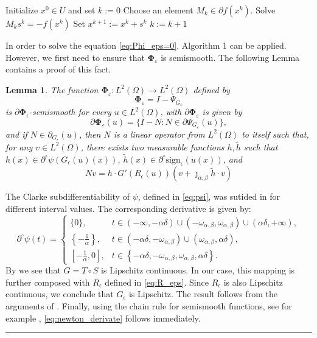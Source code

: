 \documentclass[11pt,a4paper]{amsart}
\newcommand{\kw}{\rule{2mm}{2mm}}
\renewcommand{\l}{\left}
\renewcommand{\r}{\right}
\newcommand{\om}{\Omega}
\newcommand{\sign}{\mathrm{sign}}
\renewenvironment{proof}{{Proof.}}{\hfill\kw}
\newtheorem{lemma}{{Lemma}}
\begin{document}
\begin{algorithm}
\caption{Semismooth Newton Algorithm}\label{alg:SSN}
\begin{algorithmic}[1]
\State Initialize $x^0 \in U$ and set $k := 0$
    \State Choose an element $M_k\in \partial f(x^k)$.
    \State Solve $M_ks^k = -f(x^k)$ 
    \State Set $x^{k+1} := x^k + s^k$
    \State $k := k + 1$
\EndWhile
\end{algorithmic}
\end{algorithm}
 In order to solve the equation \eqref{eq:Phi_eps=0}, Algorithm 1 can be applied. However, we first need to ensure that $\mathbf{\Phi}_\varepsilon$ is semismooth. The following Lemma contains a proof of this fact.

\begin{lemma}\label{lemma2} 
The function $\mathbf{\Phi}_\varepsilon: L^2(\om) \to L^2(\om)$ defined by
$$ \mathbf{\Phi}_\varepsilon = I - \Psi_{G_\varepsilon}$$
is $\partial \mathbf{\Phi}_{\epsilon}$-semismooth for every $u\in L^2(\om)$, with $\partial \mathbf{\Phi}_\varepsilon$ is given by
\begin{equation}
\partial \mathbf{\Phi}_\varepsilon (u) =\{I-N: N\in \partial \Psi_{G_\varepsilon}(u) \},
\end{equation}
and if $N\in \partial_{G_{\epsilon}}(u)$, then $N$ is a linear operator from $L^2(\om)$ to itself such that, for any $v\in L^2(\om)$, there exists two measurable functions $h, \tilde{h}$ such that $h(x)\in \partial^{\circ}\psi(G_{\epsilon}(u)(x))$, $\tilde{h}(x)\in \partial^{\circ}\sign_{\epsilon}(u(x))$, and
\begin{equation}\label{eq:newton_derivate}
Nv=h\cdot G'(R_{\epsilon}(u))(v+\jmath_{\alpha,\beta}\tilde{h}\cdot v)
\end{equation}

\end{lemma}
\begin{proof}
The Clarke subdifferentiability of $\psi$, defined in \eqref{eq:psi}, was sutided in \cite{CasasMateos2024} for different interval values. The corresponding derivative is given by:
    \[
    \partial^{\circ}\psi(t)=\begin{cases}
        \{0\}, & t\in (-\infty, -\alpha\delta)\cup (-\omega_{\alpha,\beta}, \omega_{\alpha,\beta})\cup (\alpha\delta,+\infty),\\
        \l\{-\frac{1}{\alpha}\r\}, & t \in (-\alpha \delta,-\omega_{\alpha,\beta})\cup (\omega_{\alpha,\beta}, \alpha \delta),\\
        \l[-\frac{1}{\alpha},0\r], & t\in \l\{-\alpha\delta, -\omega_{\alpha,\beta}, \omega_{\alpha,\beta}, \alpha\delta\r\}.
    \end{cases}
    \]
    By \cite[Lemma 2.4]{CasasMateos2024} we see that $G=T\circ S$ is Lipschitz continuous. In our case, this mapping is further composed with $R_\epsilon$ defined in \eqref{eq:R_eps}. Since $R_{\epsilon}$ is also Lipschitz continuous, we conclude that $G_{\epsilon}$ is Lipschitz. The result follows from the arguments of \cite[Lemma 3.3]{CasasMateos2024}. Finally, using the chain rule for semismooth functions, see for example \cite[Theorem 14.4]{valk}, \eqref{eq:newton_derivate} follows immediately.
\end{proof}
\end{document}

